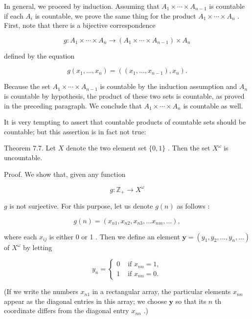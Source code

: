 In general, we proceed by induction. Assuming that \({A}_{1} \times  \cdots  \times  {A}_{n - 1}\) is countable if each \({A}_{i}\) is countable, we prove the same thing for the product \({A}_{1} \times  \cdots  \times  {A}_{n}\) . First, note that there is a bijective correspondence

\[
g : {A}_{1} \times  \cdots  \times  {A}_{n} \rightarrow  \left( {{A}_{1} \times  \cdots  \times  {A}_{n - 1}}\right)  \times  {A}_{n}
\]

defined by the equation

\[
g\left( {{x}_{1},\ldots ,{x}_{n}}\right)  = \left( {\left( {{x}_{1},\ldots ,{x}_{n - 1}}\right) ,{x}_{n}}\right) .
\]

Because the set \({A}_{1} \times  \cdots  \times  {A}_{n - 1}\) is countable by the induction assumption and \({A}_{n}\) is countable by hypothesis, the product of these two sets is countable, as proved in the preceding paragraph. We conclude that \({A}_{1} \times  \cdots  \times  {A}_{n}\) is countable as well.

It is very tempting to assert that countable products of countable sets should be countable; but this assertion is in fact not true:

Theorem 7.7. Let \(X\) denote the two element set \(\{ 0,1\}\) . Then the set \({X}^{\omega }\) is uncountable.

Proof. We show that, given any function

\[
g : {\mathbb{Z}}_{ + } \rightarrow  {X}^{\omega }
\]

\(g\) is not surjective. For this purpose, let us denote \(g\left( n\right)\) as follows :

\[
g\left( n\right)  = \left( {{x}_{n1},{x}_{n2},{x}_{n3},\ldots {x}_{nm},\ldots }\right) ,
\]

where each \({x}_{ij}\) is either 0 or 1 . Then we define an element \(\mathbf{y} = \left( {{y}_{1},{y}_{2},\ldots ,{y}_{n},\ldots }\right)\) of \({X}^{\omega }\) by letting

\[
{y}_{n} = \left\{  \begin{array}{ll} 0 & \text{ if }{x}_{nn} = 1, \\  1 & \text{ if }{x}_{nn} = 0. \end{array}\right.
\]

(If we write the numbers \({x}_{n1}\) in a rectangular array, the particular elements \({x}_{nn}\) appear as the diagonal entries in this array; we choose \(\mathbf{y}\) so that its \(n\) th coordinate differs from the diagonal entry \({x}_{nn}\) .)

